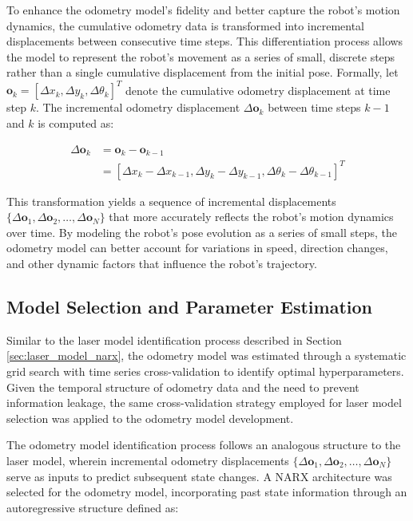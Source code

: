 \documentclass[conference]{IEEEtran}
\begin{document}
To enhance the odometry model's fidelity and better capture the robot's motion dynamics, the cumulative odometry data is transformed into incremental displacements between consecutive time steps. This differentiation process allows the model to represent the robot's movement as a series of small, discrete steps rather than a single cumulative displacement from the initial pose. Formally, let $\mathbf{o}_k = [\Delta x_k, \Delta y_k, \Delta \theta_k]^T$ denote the cumulative odometry displacement at time step $k$. The incremental odometry displacement $\Delta \mathbf{o}_k$ between time steps $k-1$ and $k$ is computed as:

\begin{equation}
    \begin{aligned}
        \Delta \mathbf{o}_k &= \mathbf{o}_k - \mathbf{o}_{k-1} \\
                            &= [\Delta x_k - \Delta x_{k-1}, \Delta y_k - \Delta y_{k-1}, \Delta \theta_k - \Delta \theta_{k-1}]^T
    \end{aligned}
\end{equation}

This transformation yields a sequence of incremental displacements $\{\Delta \mathbf{o}_1, \Delta \mathbf{o}_2, \ldots, \Delta \mathbf{o}_N\}$ that more accurately reflects the robot's motion dynamics over time. By modeling the robot's pose evolution as a series of small steps, the odometry model can better account for variations in speed, direction changes, and other dynamic factors that influence the robot's trajectory.

\subsection{Model Selection and Parameter Estimation} \label{sec:odometry_model_selection}

Similar to the laser model identification process described in Section \ref{sec:laser_model_narx}, the odometry model was estimated through a systematic grid search with time series cross-validation to identify optimal hyperparameters. Given the temporal structure of odometry data and the need to prevent information leakage, the same cross-validation strategy employed for laser model selection was applied to the odometry model development.

The odometry model identification process follows an analogous structure to the laser model, wherein incremental odometry displacements $\{\Delta \mathbf{o}_1, \Delta \mathbf{o}_2, \ldots, \Delta \mathbf{o}_N\}$ serve as inputs to predict subsequent state changes. A NARX architecture was selected for the odometry model, incorporating past state information through an autoregressive structure defined as:
\end{document}
